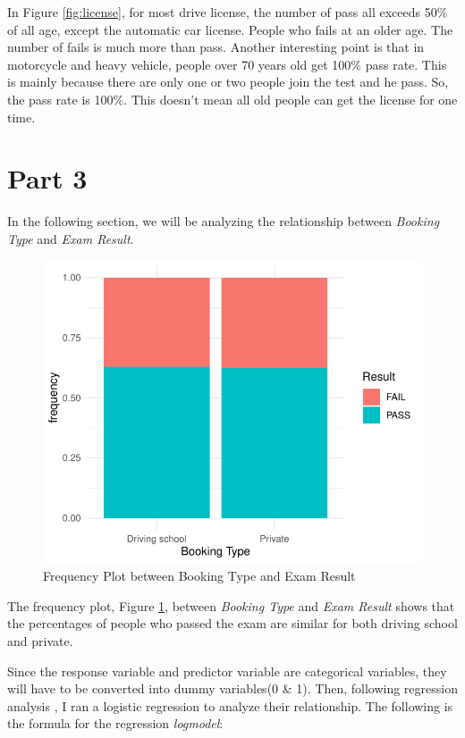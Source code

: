 \documentclass[11pt,a4paper,]{article}
\begin{document}
In Figure \ref{fig:license}, for most drive license, the number of pass all exceeds 50\% of all age, except the automatic car license. People who fails at an older age. The number of fails is much more than pass.
Another interesting point is that in motorcycle and heavy vehicle, people over 70 years old get 100\% pass rate. This is mainly because there are only one or two people join the test and he pass. So, the pass rate is 100\%. This doesn't mean all old people can get the license for one time.

\section*{Part 3}

In the following section, we will be analyzing the relationship between \emph{Booking Type} and \emph{Exam Result}.

\begin{figure}
\centering
\includegraphics{Assignment4_files/figure-latex/frequency-1.pdf}
\caption{\label{fig:frequency}Frequency Plot between Booking Type and Exam Result}
\end{figure}

The frequency plot, Figure \ref{fig:frequency}, between \emph{Booking Type} and \emph{Exam Result} shows that the percentages of people who passed the exam are similar for both driving school and private.

Since the response variable and predictor variable are categorical variables, they will have to be converted into dummy variables(0 \& 1). Then, following regression analysis \textcite{logisticregregression}, I ran a logistic regression to analyze their relationship. The following is the formula for the regression \emph{logmodel}:
\end{document}
